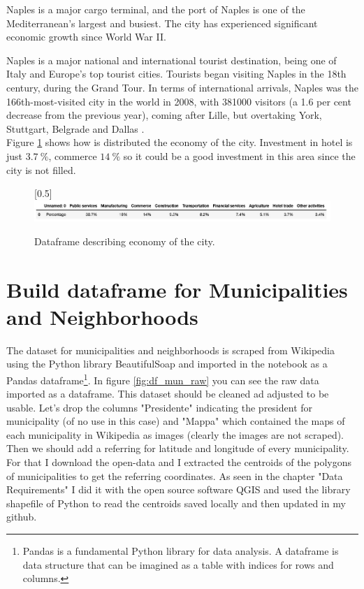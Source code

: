 \documentclass[a4paper, 12pt, oneside]{book}
\begin{document}
Naples is a major cargo terminal, and the port of Naples is one of the Mediterranean's largest and busiest. The city has experienced significant economic growth since World War II.

Naples is a major national and international tourist destination, being one of Italy and Europe's top tourist cities. Tourists began visiting Naples in the 18th century, during the Grand Tour. In terms of international arrivals, Naples was the 166th-most-visited city in the world in 2008, with 381000 visitors (a 1.6 per cent decrease from the previous year), coming after Lille, but overtaking York, Stuttgart, Belgrade and Dallas \cite{economics}.\\

Figure \ref{fig:df_economy} shows how is distributed the economy of the city. Investment in hotel is just $3.7~\%$, commerce $14~\%$ so it could be a good investment in this area since the city is not filled.

\begin{figure}[!htb]
		\centering
		\scalebox{0.45}[0.5]{\includegraphics{immagini/dataframe_economics.jpg}}
		\caption{Dataframe describing economy of the city. }
		\label{fig:df_economy}
	\end{figure}
\clearpage

\section*{Build dataframe for Municipalities and Neighborhoods} 
\label{sec:df_municipality}
The dataset for municipalities and neighborhoods is scraped from Wikipedia\cite{municipalities} using the Python library BeautifulSoap and imported in the notebook as a Pandas dataframe\footnote{Pandas is a fundamental Python library for data analysis. A dataframe is data structure that can be imagined as a table with indices for rows and columns.}. In figure \ref{fig:df_mun_raw} you can see the raw data imported as a dataframe.
This dataset should be cleaned ad adjusted to be usable. Let's drop the columns "Presidente" indicating the president for municipality (of no use in this case) and "Mappa" which contained the maps of each municipality in Wikipedia as images (clearly the images are not scraped). Then we should add a referring for latitude and longitude of every municipality. For that I download the open-data \cite{opendata} and I extracted the centroids of the polygons of municipalities to get the referring coordinates. As seen in the chapter "Data Requirements" I did it with the open source software QGIS and used the library shapefile of Python to read the centroids saved locally and then updated in my github\cite{dataset}.  
\end{document}
